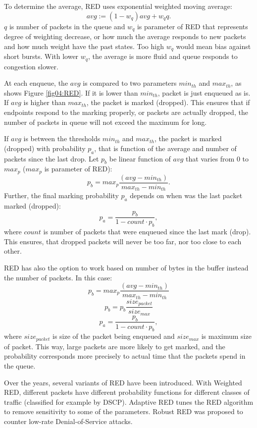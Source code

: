 To determine the average, RED uses exponential weighted moving average:
\[
avg := (1 - w_q)avg+w_qq.
\]
$q$ is number of packets in the queue and $w_q$ is parameter of RED that represents degree of weighting decrease, or how much the average responds to new packets and how much weight have the past states. Too high $w_q$ would mean bias against short bursts. With lower $w_q$, the average is more fluid and queue responds to congestion slower.

At each enqueue, the $avg$ is compared to two parameters $min_{th}$ and $max_{th}$, as shows Figure \ref{fig04:RED}. If it is lower than $min_{th}$, packet is just enqueued as is. If $avg$ is higher than $max_{th}$, the packet is marked (dropped). This ensures that if endpoints respond to the marking properly, or packets are actually dropped, the number of packets in queue will not exceed the maximum for long.

If $avg$ is between the thresholds $min_{th}$ and $max_{th}$, the packet is marked (dropped) with probability $p_a$, that is function of the average and number of packets since the last drop. Let $p_b$ be linear function of $avg$ that varies from 0 to $max_p$ ($max_p$ is parameter of RED):
\[
  p_b = max_p \frac{(avg - min_{th})}{max_{th} - min_{th}}.
\]
Further, the final marking probability $p_a$ depends on when was the last packet marked (dropped):
\[
p_a = \frac{p_b}{1-count \cdot p_b},
\]
where $count$ is number of packets that were enqueued since the last mark (drop). This ensures, that dropped packets will never be too far, nor too close to each other\cite[Section 7]{Floyd:1993:RED:169931.169935}.

RED has also the option to work based on number of bytes in the buffer instead the number of packets. In this case:
\[
  p_b = max_p \frac{(avg - min_{th})}{max_{th} - min_{th}}
\]\[
  p_b = p_b \frac{size_{packet}}{size_{max}}
\]\[
  p_a = \frac{p_b}{1-count \cdot p_b},
\]
where $size_{packet}$ is size of the packet being enqueued and $size_{max}$ is maximum size of packet. This way, large packets are more likely to get marked, and the probability corresponds more precisely to actual time that the packets spend in the queue.

Over the years, several variants of RED have been introduced. With Weighted RED, different packets have different probability functions for different classes of traffic (classified for example by DSCP). Adaptive RED \cite{Floyd01adaptivered:} tunes the RED algorithm to remove sensitivity to some of the parameters. Robust RED \cite{RRED} was proposed to counter low-rate Denial-of-Service attacks.

